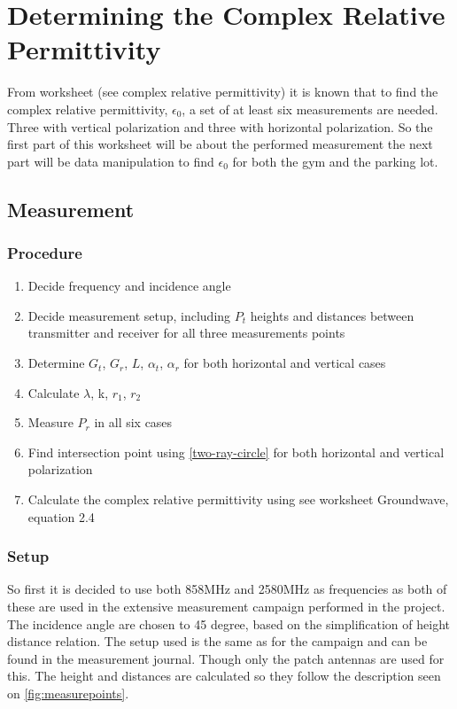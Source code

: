\chapter{Determining the Complex Relative Permittivity}


From worksheet (see complex relative permittivity) it is known that to find the complex relative permittivity, $\epsilon_0$, a set of at least six measurements are needed. Three with vertical polarization and three with horizontal polarization. So the first part of this worksheet will be about the performed measurement the next part will be data manipulation to find $\epsilon_0$ for both the gym and the parking lot.

\section{Measurement}
\subsection{Procedure}
\begin{enumerate}
	\item Decide frequency and incidence angle
	\item Decide measurement setup, including $P_t$ heights and distances between transmitter and receiver for all three measurements points
	\item Determine $G_t$, $G_r$, $L$, $\alpha_t$, $\alpha_r$ for both horizontal and vertical cases
	\item Calculate $\lambda$, k, $r_1$, $r_2$
	\item Measure $P_r$ in all six cases
	\item Find intersection point using \autoref{two-ray-circle} for both horizontal and vertical polarization
	\item Calculate the complex relative permittivity using see worksheet Groundwave, equation 2.4
\end{enumerate}

\subsection{Setup}
So first it is decided to use both 858MHz and 2580MHz as frequencies as both of these are used in the extensive measurement campaign performed in the project. The incidence angle are chosen to 45 degree, based on the simplification of height distance relation. 
The setup used is the same as for the campaign and can be found in the measurement journal. Though only the patch antennas are used for this. The height and distances are calculated so they follow the description seen on \autoref{fig:measurepoints}. 


